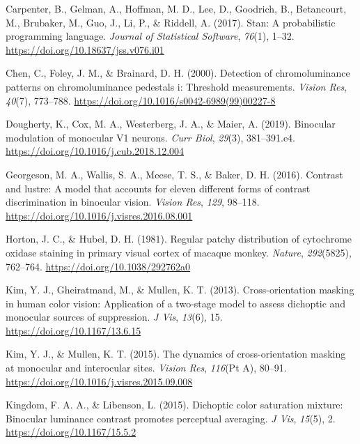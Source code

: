 \documentclass[
]{article}
\newlength{\cslhangindent}
\newlength{\cslentryspacingunit} %
\newenvironment{CSLReferences}[2] %
 {%
  \setlength{\parindent}{0pt}
  \ifodd #1
  \let\oldpar\par
  \def\par{\hangindent=\cslhangindent\oldpar}
  \fi
  \setlength{\parskip}{#2\cslentryspacingunit}
 }%
 {}
\begin{document}
\begin{CSLReferences}{1}{0}
\leavevmode{}%
Carpenter, B., Gelman, A., Hoffman, M. D., Lee, D., Goodrich, B., Betancourt, M., Brubaker, M., Guo, J., Li, P., \& Riddell, A. (2017). Stan: A probabilistic programming language. \emph{Journal of Statistical Software}, \emph{76}(1), 1--32. \url{https://doi.org/10.18637/jss.v076.i01}

\leavevmode{}%
Chen, C., Foley, J. M., \& Brainard, D. H. (2000). Detection of chromoluminance patterns on chromoluminance pedestals i: Threshold measurements. \emph{Vision Res}, \emph{40}(7), 773--788. \url{https://doi.org/10.1016/s0042-6989(99)00227-8}

\leavevmode{}%
Dougherty, K., Cox, M. A., Westerberg, J. A., \& Maier, A. (2019). Binocular modulation of monocular V1 neurons. \emph{Curr Biol}, \emph{29}(3), 381--391.e4. \url{https://doi.org/10.1016/j.cub.2018.12.004}

\leavevmode{}%
Georgeson, M. A., Wallis, S. A., Meese, T. S., \& Baker, D. H. (2016). Contrast and lustre: A model that accounts for eleven different forms of contrast discrimination in binocular vision. \emph{Vision Res}, \emph{129}, 98--118. \url{https://doi.org/10.1016/j.visres.2016.08.001}

\leavevmode{}%
Horton, J. C., \& Hubel, D. H. (1981). Regular patchy distribution of cytochrome oxidase staining in primary visual cortex of macaque monkey. \emph{Nature}, \emph{292}(5825), 762--764. \url{https://doi.org/10.1038/292762a0}

\leavevmode{}%
Kim, Y. J., Gheiratmand, M., \& Mullen, K. T. (2013). Cross-orientation masking in human color vision: Application of a two-stage model to assess dichoptic and monocular sources of suppression. \emph{J Vis}, \emph{13}(6), 15. \url{https://doi.org/10.1167/13.6.15}

\leavevmode{}%
Kim, Y. J., \& Mullen, K. T. (2015). The dynamics of cross-orientation masking at monocular and interocular sites. \emph{Vision Res}, \emph{116}(Pt A), 80--91. \url{https://doi.org/10.1016/j.visres.2015.09.008}

\leavevmode{}%
Kingdom, F. A. A., \& Libenson, L. (2015). Dichoptic color saturation mixture: Binocular luminance contrast promotes perceptual averaging. \emph{J Vis}, \emph{15}(5), 2. \url{https://doi.org/10.1167/15.5.2}


\end{CSLReferences}
\end{document}
